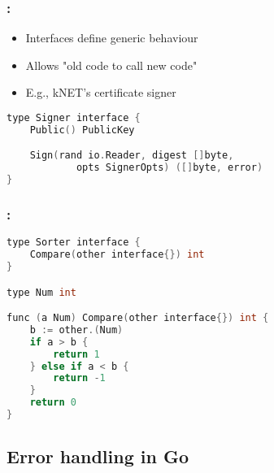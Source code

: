 \begin{frame}[fragile]
    \frametitle{\secname: \small\subsecname\normalsize}

    \begin{itemize}
        \item Interfaces define generic behaviour
        \item Allows "old code to call new code"
        \item E.g., kNET's certificate signer
    \end{itemize}

    \small \begin{lstlisting}[language=c]
type Signer interface {
    Public() PublicKey

    Sign(rand io.Reader, digest []byte,
            opts SignerOpts) ([]byte, error)
}
    \end{lstlisting} \normalsize
\end{frame}

\begin{frame}[fragile]
    \frametitle{\secname: \small\subsecname\normalsize}

    \small \begin{lstlisting}[language=c]
type Sorter interface {
    Compare(other interface{}) int
}

type Num int

func (a Num) Compare(other interface{}) int {
    b := other.(Num)
    if a > b {
        return 1
    } else if a < b {
        return -1
    }
    return 0
}
    \end{lstlisting} \normalsize
\end{frame}

\subsection{Error handling in Go}

